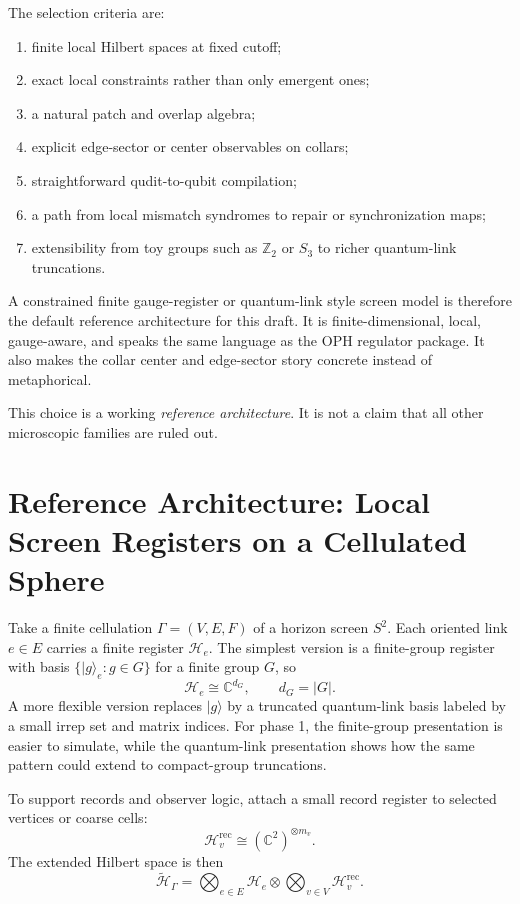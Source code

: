 \documentclass[11pt]{article}
\begin{document}
The selection criteria are:
\begin{enumerate}[leftmargin=2em]
\item finite local Hilbert spaces at fixed cutoff;
\item exact local constraints rather than only emergent ones;
\item a natural patch and overlap algebra;
\item explicit edge-sector or center observables on collars;
\item straightforward qudit-to-qubit compilation;
\item a path from local mismatch syndromes to repair or synchronization maps;
\item extensibility from toy groups such as $\mathbb Z_2$ or $S_3$ to richer quantum-link
truncations.
\end{enumerate}

A constrained finite gauge-register or quantum-link style screen model is therefore the
default reference architecture for this draft. It is finite-dimensional, local, gauge-aware,
and speaks the same language as the OPH regulator package. It also makes the collar
center and edge-sector story concrete instead of metaphorical.

This choice is a working \emph{reference architecture}. It is not a claim that all other
microscopic families are ruled out.

\section{Reference Architecture: Local Screen Registers on a Cellulated Sphere}

Take a finite cellulation $\Gamma=(V,E,F)$ of a horizon screen $S^2$. Each oriented link
$e\in E$ carries a finite register $\mathcal H_e$. The simplest version is a finite-group
register with basis $\{|g\rangle_e:g\in G\}$ for a finite group $G$, so
\begin{equation}
\mathcal H_e \cong \mathbb C^{d_G},\qquad d_G=|G|.
\end{equation}
A more flexible version replaces $|g\rangle$ by a truncated quantum-link basis labeled by a
small irrep set and matrix indices. For phase 1, the finite-group presentation is easier to
simulate, while the quantum-link presentation shows how the same pattern could extend to
compact-group truncations.

To support records and observer logic, attach a small record register to selected vertices or
coarse cells:
\begin{equation}
\mathcal H_v^{\mathrm{rec}} \cong (\mathbb C^2)^{\otimes m_v}.
\end{equation}
The extended Hilbert space is then
\begin{equation}
\widetilde{\mathcal H}_{\Gamma}=
\bigotimes_{e\in E}\mathcal H_e
\otimes
\bigotimes_{v\in V}\mathcal H_v^{\mathrm{rec}}.
\end{equation}
\end{document}
